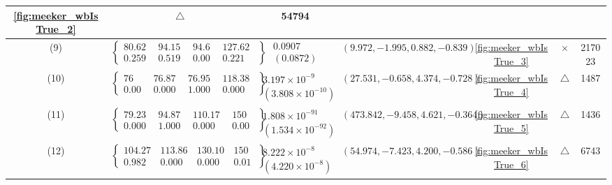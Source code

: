 \begin{table}[H]
\begin{adjustwidth}{-2.5cm}{-2.5cm}
{\begin{tabular}{|c|c|c|c|c|c|c|}
\ref{fig:meeker_wbIsTrue_2} & $\triangle$ & 54794 \\
\hline
(9) & $\left\{\begin{array}{cccc}
80.622 & 94.153 & 94.67 & 127.625 \\
0.259 & 0.519 & 0.000 & 0.221
\end{array}\right\}$ &
$\begin{array}{c}
0.0907 \\
(0.0872)
\end{array}$ & 
$(9.972, -1.995, 0.882, -0.839)$ & 
\ref{fig:meeker_wbIsTrue_3} & $\times$ & 217023 \\
\hline
(10) & $\left\{\begin{array}{cccc}
76 & 76.879 & 76.950 & 118.382 \\
0.000 & 0.000 & 1.000 & 0.000
\end{array}\right\}$ &
$\begin{array}{c}
3.197\times 10^{-9} \\
(3.808\times 10^{-10})
\end{array}$ & 
$(27.531, -0.658, 4.374, -0.728)$ & 
\ref{fig:meeker_wbIsTrue_4} & $\triangle$ & 1487 \\
\hline
(11) & $\left\{\begin{array}{cccc}
79.235 & 94.878 & 110.173 & 150 \\
0.000 & 1.000 & 0.000 & 0.000
\end{array}\right\}$ &
$\begin{array}{c}
1.808\times 10^{-91} \\
(1.534\times 10^{-92})
\end{array}$ & 
$(473.842, -9.458, 4.621, -0.364)$ & 
\ref{fig:meeker_wbIsTrue_5} & $\triangle$ & 1436 \\
\hline
(12) & $\left\{\begin{array}{cccc}
104.273 & 113.865 & 130.105 & 150 \\
0.982 & 0.000 & 0.000 & 0.018
\end{array}\right\}$ &
$\begin{array}{c}
8.222\times 10^{-8} \\
(4.220\times 10^{-8})
\end{array}$ & 
$(54.974, -7.423, 4.200, -0.586)$ & 
\ref{fig:meeker_wbIsTrue_6} & $\triangle$ & 6743 \\
\hline
\end{tabular}
}
\end{adjustwidth}
\end{table}

